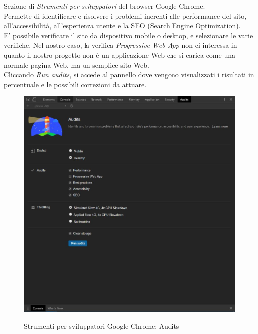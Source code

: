 Sezione di \emph{Strumenti per sviluppatori} del browser Google Chrome.\\
Permette di identificare e risolvere i problemi inerenti alle performance del sito, all'accessibilità, all'esperienza utente e la SEO (Search Engine Optimization).\\
E' possibile verificare il sito da dispositivo mobile o desktop, e selezionare le varie verifiche. Nel nostro caso, la verifica \emph{Progressive Web App} non ci interessa in quanto il nostro progetto non è un applicazione Web che si carica come una normale pagina Web, ma un semplice sito Web.\\
Cliccando \emph{Run audits}, si accede al pannello dove vengono visualizzati i risultati in percentuale e le possibili correzioni da attuare.
\begin{figure}[!h]
	\centering
	\includegraphics[width=0.7\linewidth]{sezioni/FaseTest/Immagini/audits.JPG}\\
	\caption{Strumenti per sviluppatori Google Chrome: Audits}
	\label{Fig:audits}
\end{figure}

\newpage